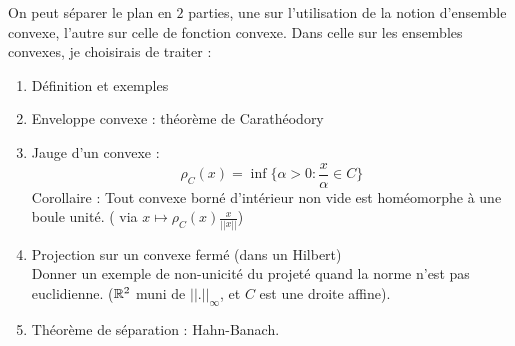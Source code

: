 On peut séparer le plan en $2$ parties, une sur l'utilisation de la notion d'ensemble convexe, l'autre sur celle de fonction convexe. Dans celle sur les ensembles convexes, je choisirais de traiter :
\begin{enumerate}
\item Définition et exemples
\item Enveloppe convexe : théorème de Carathéodory
\item Jauge d'un convexe : \[\rho_C(x)=\inf \{ \alpha >0 : \frac{x}{\alpha}\in C\} \]
Corollaire : Tout convexe borné d'intérieur non vide est homéomorphe à une boule unité. ( via $x\mapsto \rho_C(x)\frac{x}{||x||}$)
\item Projection sur un convexe fermé (dans un Hilbert) \\
Donner un exemple de non-unicité du projeté quand la norme n'est pas euclidienne. ($\mathbb R^2$ muni de $||.||_\infty$, et $C$ est une droite affine).
\item Théorème de séparation : Hahn-Banach.
\end{enumerate}

